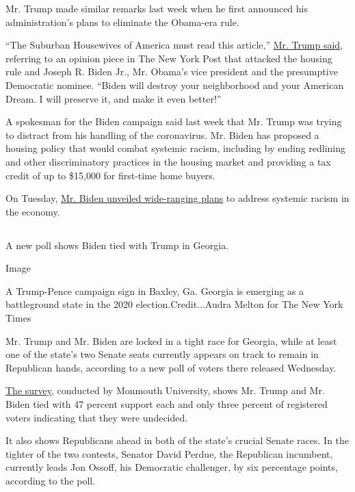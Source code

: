 Mr. Trump made similar remarks last week when he first announced his
administration's plans to eliminate the Obama-era rule.

``The Suburban Housewives of America must read this article,''
\href{https://twitter.com/realDonaldTrump/status/1286372175117791236?s=20}{Mr.
Trump said}, referring to an opinion piece in The New York Post that
attacked the housing rule and Joseph R. Biden Jr., Mr. Obama's vice
president and the presumptive Democratic nominee. ``Biden will destroy
your neighborhood and your American Dream. I will preserve it, and make
it even better!''

A spokesman for the Biden campaign said last week that Mr. Trump was
trying to distract from his handling of the coronavirus. Mr. Biden has
proposed a housing policy that would combat systemic racism, including
by ending redlining and other discriminatory practices in the housing
market and providing a tax credit of up to \$15,000 for first-time home
buyers.

On Tuesday,
\href{https://www.nytimes.com/2020/07/28/us/politics/joe-biden-racial-justice-economy-plan.html}{Mr.
Biden unveiled wide-ranging plans} to address systemic racism in the
economy.

\hypertarget{-1}{%
\subsection{}\label{-1}}

A new poll shows Biden tied with Trump in Georgia.

Image

A Trump-Pence campaign sign in Baxley, Ga. Georgia is emerging as a
battleground state in the 2020 election.Credit...Audra Melton for The
New York Times

Mr. Trump and Mr. Biden are locked in a tight race for Georgia, while at
least one of the state's two Senate seats currently appears on track to
remain in Republican hands, according to a new poll of voters there
released Wednesday.

\href{https://www.monmouth.edu/polling-institute/reports/monmouthpoll_GA_072920/}{The
survey}, conducted by Monmouth University, shows Mr. Trump and Mr. Biden
tied with 47 percent support each and only three percent of registered
voters indicating that they were undecided.

It also shows Republicans ahead in both of the state's crucial Senate
races. In the tighter of the two contests, Senator David Perdue, the
Republican incumbent, currently leads Jon Ossoff, his Democratic
challenger, by six percentage points, according to the poll.

